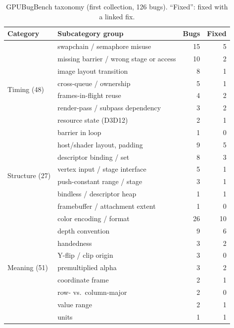 \documentclass[acmtog,anonymous,review]{acmart}
\newcommand{\bench}{GPUBugBench\xspace}
\begin{document}
\begin{table}[htbp]
\caption{\bench taxonomy (first collection, 126 bugs). ``Fixed'': fixed with a linked fix.}
\label{tab:s-taxonomy}
\scriptsize
\begin{tabular}{@{}llrr@{}}
\toprule
Category & Subcategory group & Bugs & Fixed \\
\midrule
\multirow{8}{*}{Timing (48)} & swapchain / semaphore misuse & 15 & 5 \\
 & missing barrier / wrong stage or access & 10 & 2 \\
 & image layout transition & 8 & 1 \\
 & cross-queue / ownership & 5 & 1 \\
 & frames-in-flight reuse & 4 & 2 \\
 & render-pass / subpass dependency & 3 & 2 \\
 & resource state (D3D12) & 2 & 1 \\
 & barrier in loop & 1 & 0 \\
\midrule
\multirow{6}{*}{Structure (27)} & host/shader layout, padding & 9 & 5 \\
 & descriptor binding / set & 8 & 3 \\
 & vertex input / stage interface & 5 & 1 \\
 & push-constant range / stage & 3 & 1 \\
 & bindless / descriptor heap & 1 & 1 \\
 & framebuffer / attachment extent & 1 & 0 \\
\midrule
\multirow{9}{*}{Meaning (51)} & color encoding / format & 26 & 10 \\
 & depth convention & 9 & 6 \\
 & handedness & 3 & 2 \\
 & Y-flip / clip origin & 3 & 0 \\
 & premultiplied alpha & 3 & 2 \\
 & coordinate frame & 2 & 1 \\
 & row- vs.\ column-major & 2 & 0 \\
 & value range & 2 & 1 \\
 & units & 1 & 1 \\
\bottomrule
\end{tabular}
\end{table}
\end{document}
